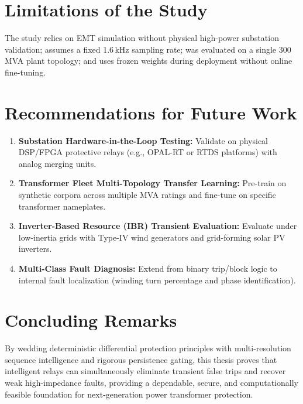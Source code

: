 \documentclass[12pt,a4paper,oneside]{report}
\begin{document}
\section{Limitations of the Study}
The study relies on EMT simulation without physical high-power substation validation; assumes a fixed 1.6\,kHz sampling rate; was evaluated on a single 300\,MVA plant topology; and uses frozen weights during deployment without online fine-tuning.

\section{Recommendations for Future Work}
\begin{enumerate}[leftmargin=1.6em,itemsep=2pt]
\item \textbf{Substation Hardware-in-the-Loop Testing:} Validate on physical DSP/FPGA protective relays (e.g., OPAL-RT or RTDS platforms) with analog merging units.
\item \textbf{Transformer Fleet Multi-Topology Transfer Learning:} Pre-train on synthetic corpora across multiple MVA ratings and fine-tune on specific transformer nameplates.
\item \textbf{Inverter-Based Resource (IBR) Transient Evaluation:} Evaluate under low-inertia grids with Type-IV wind generators and grid-forming solar PV inverters.
\item \textbf{Multi-Class Fault Diagnosis:} Extend from binary trip/block logic to internal fault localization (winding turn percentage and phase identification).
\end{enumerate}

\section{Concluding Remarks}
By wedding deterministic differential protection principles with multi-resolution sequence intelligence and rigorous persistence gating, this thesis proves that intelligent relays can simultaneously eliminate transient false trips and recover weak high-impedance faults, providing a dependable, secure, and computationally feasible foundation for next-generation power transformer protection.

\end{document}
